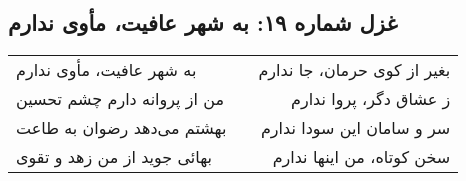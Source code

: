 \begin{center}
\section*{غزل شماره ۱۹: به شهر عافیت، مأوی ندارم}
\label{sec:019}
\begin{longtable}{l p{0.5cm} r}
به شهر عافیت، مأوی ندارم
&&
بغیر از کوی حرمان، جا ندارم
\\
من از پروانه دارم چشم تحسین
&&
ز عشاق دگر، پروا ندارم
\\
بهشتم می‌دهد رضوان به طاعت
&&
سر و سامان این سودا ندارم
\\
بهائی جوید از من زهد و تقوی
&&
سخن کوتاه، من اینها ندارم
\\
\end{longtable}
\end{center}
